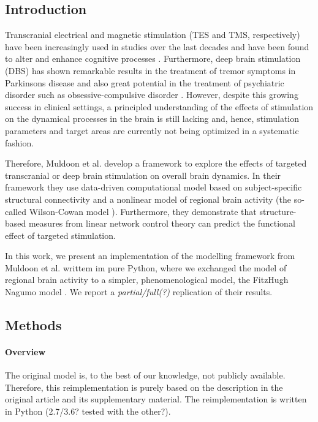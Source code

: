 \subsection{Introduction}


Transcranial electrical and magnetic stimulation  (TES and TMS, respectively) have been increasingly used in studies over the last decades and have been found to
alter and enhance cognitive processes
\supercite{Walsh2000,Lage2016,Paulus2016}. Furthermore, deep brain stimulation (DBS) has shown remarkable results in the treatment of tremor symptoms in 
Parkinsons disease \supercite{Collomb-Clerc2015} and also great potential 
in the treatment of psychiatric disorder such as obsessive-compulsive disorder \supercite{Alonso2015}.
However, despite this growing success in clinical settings, a principled understanding of the effects of stimulation on the dynamical processes in the brain 
is still lacking and, hence, stimulation parameters and target areas are currently not being optimized in a systematic fashion.    

Therefore, Muldoon et al. \supercite{Muldoon2016} develop a framework to explore the effects of targeted transcranial or deep brain stimulation on overall 
brain dynamics. In their framework they use data-driven computational model based on subject-specific structural connectivity and a nonlinear model of regional
brain activity (the so-called Wilson-Cowan model \supercite{Wilson1972}). Furthermore, they demonstrate that structure-based measures from linear network control theory 
can predict the functional effect of targeted stimulation.

In this work, we present an implementation of the modelling framework from Muldoon et al. \supercite{Muldoon2016} writtem im pure Python, where we exchanged
the model of regional brain activity to a simpler, phenomenological model, the FitzHugh Nagumo model \supercite{FitzHugh1961}. We report a \textit{partial/full(?)} 
replication of their results.
\subsection{Methods}

\paragraph{Overview}
The original model is, to the best of our knowledge, not publicly available. Therefore, this reimplementation is purely based on the description in the original
article and its supplementary material. The reimplementation is written in Python (2.7/3.6? tested with the other?). 

